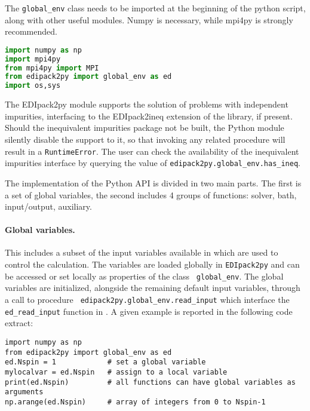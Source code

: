 \documentclass[edipack_sp.tex]{subfiles}
\begin{document}
The {\tt global\_env} class needs to be imported at the beginning
of the python script, along with other useful modules. Numpy is
necessary, while mpi4py is strongly recommended.

\begin{lstlisting}[language=python,  frame=lines]
import numpy as np
import mpi4py
from mpi4py import MPI
from edipack2py import global_env as ed
import os,sys
\end{lstlisting}

The EDIpack2py module supports the solution of problems with independent
impurities, interfacing to the EDIpack2ineq extension of the
library, if present. Should the inequivalent impurities package not be
built, the Python module silently disable the support to it, so that
invoking any related procedure  will result in a {\tt RuntimeError}.
The user can check the availability of the inequivalent impurities
interface by querying the value of  {\tt edipack2py.global\_env.has\_ineq}.

The implementation of the Python API is divided in two main parts. The
first is a set of global variables, the second includes 4 groups of
functions: solver, bath, input/output, auxiliary. 

\paragraph{{\bf Global variables}.}
This includes a subset of the input variables available in \NAME which
are used to control the calculation.
The variables are loaded globally in {\tt EDIpack2py} and can be accessed
or set locally as properties of the class {\tt
  global\_env}. The global variables are initialized, alongside the remaining
default input variables, through a call to procedure {\tt
  edipack2py.global\_env.read\_input} which interface the {\tt
  ed\_read\_input} function in \NAME. 
A given example is reported in the following code extract:

\begin{lstlisting}[style=mypython,frame=lines]
import numpy as np
from edipack2py import global_env as ed
ed.Nspin = 1            # set a global variable
mylocalvar = ed.Nspin   # assign to a local variable
print(ed.Nspin)         # all functions can have global variables as arguments
np.arange(ed.Nspin)     # array of integers from 0 to Nspin-1
\end{lstlisting}
\end{document}
